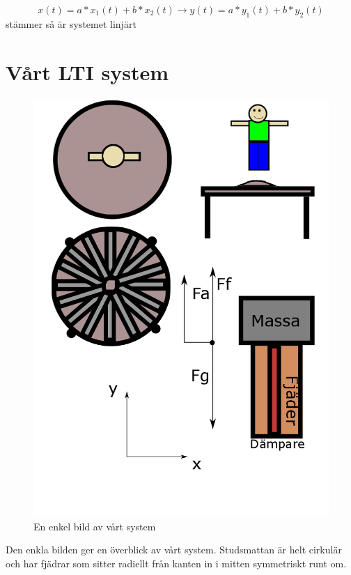 \documentclass[10pt,a4paper]{article}
\begin{document}
\begin{equation}
x(t) = a*x_1(t) + b*x_2(t)\rightarrow y(t) = a*y_1(t) + b*y_2(t)
\end{equation}
stämmer så är systemet linjärt

\newpage
\section{Vårt LTI system}

\begin{figure}[ht]
\caption{En enkel bild av vårt system}
\includegraphics[scale=0.4]{Bild}
\end{figure}
\clearpage

Den enkla bilden ger en överblick av vårt system. Studsmattan är helt cirkulär och har fjädrar som sitter radiellt från kanten in i mitten symmetriskt runt om.
\end{document}

